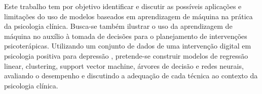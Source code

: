 Este trabalho tem por objetivo identificar e discutir as possíveis aplicações e limitações do uso de modelos baseados em aprendizagem de máquina na prática da psicologia
clínica. Busca-se também ilustrar o uso da aprendizagem de máquina no auxílio à tomada de decisões para o planejamento de intervenções psicoterápicas. Utilizando um
conjunto de dados de uma intervenção digital em psicologia positiva para depressão \cite{Collins2023}, pretende-se construir modelos de regressão linear, clustering, support
vector machine, árvores de decisão e redes neurais, avaliando o desempenho e discutindo a adequação de cada técnica ao contexto da psicologia clínica.